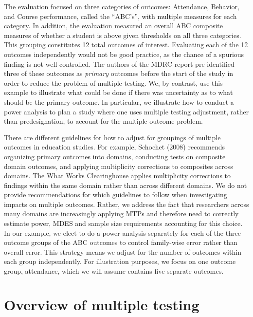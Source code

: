 \documentclass[
]{article}
\begin{document}
The evaluation focused on three categories of outcomes: Attendance,
Behavior, and Course performance, called the ``ABC's'', with multiple
measures for each category. In addition, the evaluation measured an
overall ABC composite measures of whether a student is above given
thresholds on all three categories. This grouping constitutes 12 total
outcomes of interest. Evaluating each of the 12 outcomes independently
would not be good practice, as the chance of a spurious finding is not
well controlled. The authors of the MDRC report pre-identified three of
these outcomes as \emph{primary} outcomes before the start of the study
in order to reduce the problem of multiple testing. We, by contrast, use
this example to illustrate what could be done if there was uncertainty
as to what should be the primary outcome. In particular, we illustrate
how to conduct a power analysis to plan a study where one uses multiple
testing adjustment, rather than predesignation, to account for the
multiple outcome problem.

There are different guidelines for how to adjust for groupings of
multiple outcomes in education studies. For example, Schochet (2008)
recommends organizing primary outcomes into domains, conducting tests on
composite domain outcomes, and applying multiplicity corrections to
composites across domains. The What Works Clearinghouse applies
multiplicity corrections to findings within the same domain rather than
across different domains. We do not provide recommendations for which
guidelines to follow when investigating impacts on multiple outcomes.
Rather, we address the fact that researchers across many domains are
increasingly applying MTPs and therefore need to correctly estimate
power, MDES and sample size requirements accounting for this choice. In
our example, we elect to do a power analysis separately for each of the
three outcome groups of the ABC outcomes to control family-wise error
rather than overall error. This strategy means we adjust for the number
of outcomes within each group independently. For illustration purposes,
we focus on one outcome group, attendance, which we will assume contains
five separate outcomes.

\section{Overview of multiple testing}
\label{sec:mtp_overview}
\end{document}

